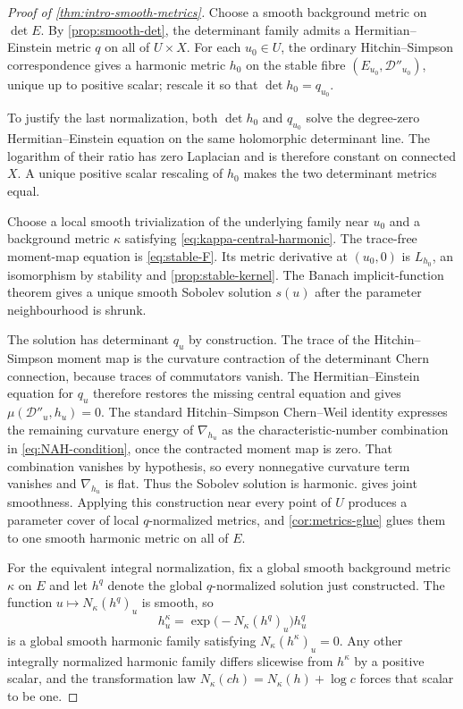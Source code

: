 \documentclass[11pt,reqno]{amsart}
\theoremstyle{definition}
\theoremstyle{remark}
\newcommand{\cD}{\mathcal D}
\begin{document}
\begin{proof}[Proof of \cref{thm:intro-smooth-metrics}]
Choose a smooth background metric on $\det E$.  By \cref{prop:smooth-det}, the determinant family admits a Hermitian--Einstein metric $q$ on all of $U\times X$.  For each $u_0\in U$, the ordinary Hitchin--Simpson correspondence gives a harmonic metric $h_0$ on the stable fibre $(E_{u_0},\cD''_{u_0})$, unique up to positive scalar; rescale it so that $\det h_0=q_{u_0}$.

To justify the last normalization, both $\det h_0$ and $q_{u_0}$
solve the degree-zero Hermitian--Einstein equation on the same
holomorphic determinant line.  The logarithm of their ratio has zero
Laplacian and is therefore constant on connected $X$.  A unique
positive scalar rescaling of $h_0$ makes the two determinant metrics
equal.

Choose a local smooth trivialization of the underlying family near
$u_0$ and a background metric $\kappa$ satisfying
\eqref{eq:kappa-central-harmonic}.  The trace-free moment-map equation
is \eqref{eq:stable-F}.  Its metric derivative at $(u_0,0)$ is
$L_{h_0}$, an isomorphism by stability and
\cref{prop:stable-kernel}.  The Banach implicit-function theorem gives
a unique smooth Sobolev solution $s(u)$ after the parameter
neighbourhood is shrunk.

The solution has determinant $q_u$ by construction.  The trace of the
Hitchin--Simpson moment map is the curvature contraction of the
determinant Chern connection, because traces of commutators vanish.
The Hermitian--Einstein equation for $q_u$ therefore restores the
missing central equation and gives $\mu(\cD''_u,h_u)=0$.  The standard
Hitchin--Simpson Chern--Weil identity expresses the remaining curvature
energy of $\nabla_{h_u}$ as the characteristic-number combination in
\eqref{eq:NAH-condition}, once the contracted moment map is zero.  That
combination vanishes by hypothesis, so every nonnegative curvature
term vanishes and $\nabla_{h_u}$ is flat.  Thus the Sobolev solution is
harmonic.   gives joint smoothness.
Applying this construction near every point of $U$ produces a parameter
cover of local $q$-normalized metrics, and
\cref{cor:metrics-glue} glues them to one smooth harmonic metric on all
of $E$.

For the equivalent integral normalization, fix a global smooth background metric $\kappa$ on $E$ and let $h^q$ denote the global $q$-normalized solution just constructed.  The function $u\mapsto N_\kappa(h^q)_u$ is smooth, so
\[
  h^\kappa_u=\exp\!\bigl(-N_\kappa(h^q)_u\bigr)h^q_u
\]
is a global smooth harmonic family satisfying $N_\kappa(h^\kappa)_u=0$.  Any other integrally normalized harmonic family differs slicewise from $h^\kappa$ by a positive scalar, and the transformation law $N_\kappa(ch)=N_\kappa(h)+\log c$ forces that scalar to be one.


\end{proof}
\end{document}
